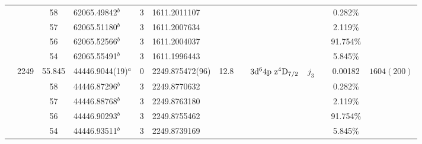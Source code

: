 \begin{table*}
\begin{center}
{\begin{tabular}{:l;l;c;l;c;l;c;l;l;c;c;c;c}
\rowstyle{\itshape}               &        & 58        & 62065.49842$^{b}$                & 3 &  1611.2011107      &      & $                                        $ & $                                        $ & $      $ &              & 0.282\%   & $          $\\
\rowstyle{\itshape}               &        & 57        & 62065.51180$^{b}$                & 3 &  1611.2007634      &      & $                                        $ & $                                        $ & $      $ &              & 2.119\%   & $          $\\
\rowstyle{\itshape}               &        & 56        & 62065.52566$^{b}$                & 3 &  1611.2004037      &      & $                                        $ & $                                        $ & $      $ &              & 91.754\%  & $          $\\
\rowstyle{\itshape}               &        & 54        & 62065.55491$^{b}$                & 3 &  1611.1996443      &      & $                                        $ & $                                        $ & $      $ &              & 5.845\%   & $          $\\
                                  & 2249   & 55.845    & 44446.9044(19)$^{a}$             & 0 &   2249.875472(96)  & 12.8 & $                                        $ & $3\rm{d}^64\rm{p~z}^4\rm{D}_{7/2}        $ & $j_{3} $ &              & 0.00182   & $ 1604(200)$\\
\rowstyle{\itshape}               &        & 58        & 44446.87296$^{b}$                & 3 &  2249.8770632      &      & $                                        $ & $                                        $ & $      $ &              & 0.282\%   & $          $\\
\rowstyle{\itshape}               &        & 57        & 44446.88768$^{b}$                & 3 &  2249.8763180      &      & $                                        $ & $                                        $ & $      $ &              & 2.119\%   & $          $\\
\rowstyle{\itshape}               &        & 56        & 44446.90293$^{b}$                & 3 &  2249.8755462      &      & $                                        $ & $                                        $ & $      $ &              & 91.754\%  & $          $\\
\rowstyle{\itshape}               &        & 54        & 44446.93511$^{b}$                & 3 &  2249.8739169      &      & $                                        $ & $                                        $ & $      $ &              & 5.845\%   & $          $\\

\end{tabular}}
\end{center}
\end{table*}
